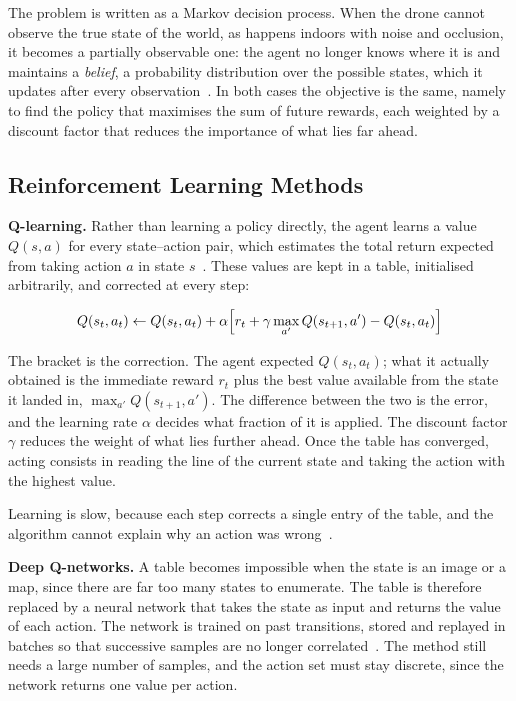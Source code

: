 The problem is written as a Markov decision process. When the drone cannot
observe the true state of the world, as happens indoors with noise and occlusion,
it becomes a partially observable one: the agent no longer knows where it is and
maintains a \emph{belief}, a probability distribution over the possible states,
which it updates after every observation~\cite{sandino2020autonomous}. In both
cases the objective is the same, namely to find the policy that maximises the sum
of future rewards, each weighted by a discount factor that reduces the importance
of what lies far ahead.

\subsection{Reinforcement Learning Methods}%
\label{subsec:nav:rl}

\textbf{Q-learning.} Rather than learning a policy directly, the agent learns a
value $Q(s,a)$ for every state--action pair, which estimates the total return
expected from taking action $a$ in state $s$~\cite{chang2023review}. These values
are kept in a table, initialised arbitrarily, and corrected at every step:

\begin{equation}
    Q(s_t, a_t) \leftarrow Q(s_t, a_t) + \alpha \Bigl[ r_t
    + \gamma \max_{a'} Q(s_{t+1}, a') - Q(s_t, a_t) \Bigr]
    \label{eq:nav:qlearning}
\end{equation}

The bracket is the correction. The agent expected $Q(s_t, a_t)$; what it actually
obtained is the immediate reward $r_t$ plus the best value available from the
state it landed in, $\max_{a'} Q(s_{t+1}, a')$. The difference between the two is
the error, and the learning rate $\alpha$ decides what fraction of it is applied.
The discount factor $\gamma$ reduces the weight of what lies further ahead. Once
the table has converged, acting consists in reading the line of the current state
and taking the action with the highest value.

Learning is slow, because each step corrects a single entry of the table, and the
algorithm cannot explain why an action was wrong~\cite{krayani2022novel}.

\textbf{Deep Q-networks.} A table becomes impossible when the state is an image
or a map, since there are far too many states to enumerate. The table is
therefore replaced by a neural network that takes the state as input and returns
the value of each action. The network is trained on past transitions, stored and
replayed in batches so that successive samples are no longer
correlated~\cite{ding2024external}. The method still needs a large number of
samples, and the action set must stay discrete, since the network returns one
value per action.

